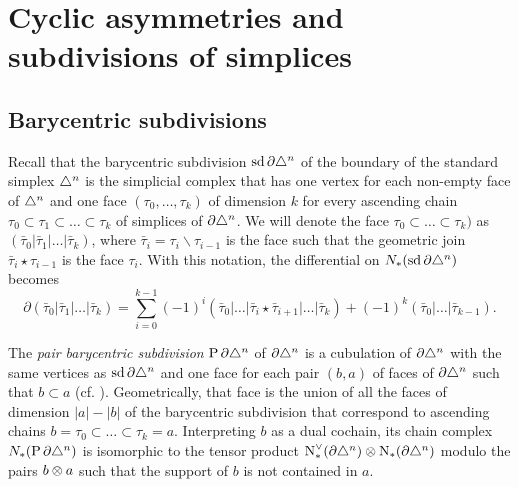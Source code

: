 
\section{Cyclic asymmetries and subdivisions of simplices}\label{section:atlast}

\subsection{Barycentric subdivisions}\label{s:assembly}

Recall that the barycentric subdivision $\operatorname{sd} \partial\triangle^n$ of the boundary of the standard simplex $\triangle^n$ is the simplicial complex that has one vertex for each non-empty face of $\triangle^n$ and one face $(\tau_0,\ldots,\tau_k)$ of dimension $k$ for every ascending chain $\tau_0\subset \tau_1\subset\ldots \subset \tau_k$ of simplices of $\partial \triangle^n$. We will denote the face $\tau_0\subset \ldots\subset \tau_k)$ as $(\bar{\tau}_0|\bar{\tau}_1|\ldots|\bar{\tau}_k)$, where $\bar{\tau}_i = \tau_i\smallsetminus \tau_{i-1}$ is the face such that the geometric join $\bar{\tau}_i\star \tau_{i-1}$ is the face $\tau_i$. With this notation, the differential on $N_{*}(\operatorname{sd} \partial \triangle^n)$ becomes
\[
\partial(\bar{\tau}_0|\bar{\tau}_1|\ldots|\bar{\tau}_k) = \sum_{i=0}^{k-1} (-1)^i(\bar{\tau}_0|\ldots|\bar{\tau}_i\star \bar{\tau}_{i+1}|\ldots |\bar{\tau}_k) + (-1)^k (\bar{\tau}_0|\ldots|\bar{\tau}_{k-1}).
\]

The \emph{pair barycentric subdivision} $\operatorname{P} \partial\triangle^n$ of $\partial \triangle^n$ is a cubulation of $\partial \triangle^n$ with the same vertices as $\operatorname{sd} \partial \triangle^n$ and one face for each pair $(b,a)$ of faces of $\partial\triangle^n$ such that $b\subset a$ (cf. \cite{Rounds2010}). Geometrically, that face is the union of all the faces of dimension $|a|-|b|$ of the barycentric subdivision that correspond to ascending chains $b = \tau_0\subset \ldots\subset \tau_k= a$. Interpreting $b$ as a dual cochain, its chain complex $N_{*}(\operatorname{P} \partial\triangle^n)$ is isomorphic to the tensor product $\operatorname{N}^\vee_{*}(\partial\triangle^n) \otimes  \operatorname{N}_{*}(\partial\triangle^n)$ modulo the pairs $b \otimes  a$ such that the support of $b$ is not contained in $a$.

